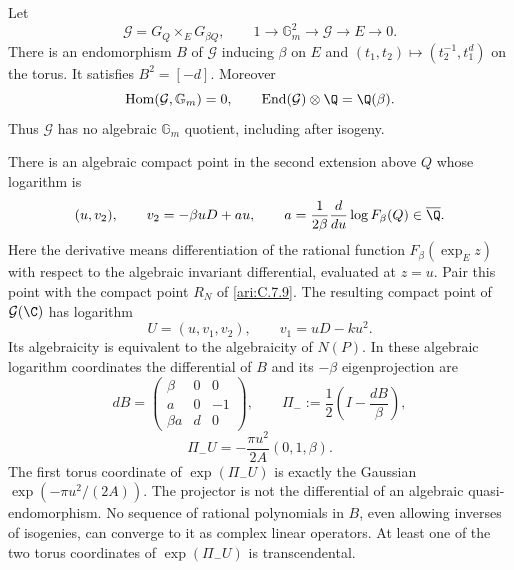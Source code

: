 \begin{proposition}\hypertarget{tag-0018}{}\label{ari:C.7.10}

Let
\[
 \mathcal G=G_Q\mathbin{\times_E}G_{\beta Q},\qquad
 1\longrightarrow\mathbb G_m^2\longrightarrow\mathcal G
       \longrightarrow E\longrightarrow0.
\]
There is an endomorphism $B$ of $\mathcal G$ inducing
$\beta$ on $E$ and
$(t_1,t_2)\mapsto(t_2^{-1},t_1^d)$ on the torus.
It satisfies $B^2=[-d]$. Moreover
\[
 \operatorname{Hom}(\mathcal G,\mathbb G_m)=0,
 \qquad
 \operatorname{End}(\mathcal G)\otimes\Q=\Q(\beta).
\]
Thus $\mathcal G$ has no algebraic $\mathbb G_m$ quotient,
including after isogeny.

There is an algebraic compact point in the second extension
above $Q$ whose logarithm is
\[
 (u,v_2),\qquad v_2=-\beta uD+au,
 \qquad
 a=\frac1{2\beta}
       \frac{d}{du}\log F_\beta(Q)\in\overline\Q.
\]
Here the derivative means differentiation of the rational
function $F_\beta(\exp_E z)$ with respect to the algebraic
invariant differential, evaluated at $z=u$.
Pair this point with the compact point $R_N$ of
\ref{ari:C.7.9}. The resulting compact point of $\mathcal G(\C)$
has logarithm
\[
 U=(u,v_1,v_2),\qquad v_1=uD-ku^2.
\]
Its algebraicity is equivalent to the algebraicity of $N(P)$.
In these algebraic logarithm coordinates the differential of
$B$ and its $-\beta$ eigenprojection are
\[
 dB=\begin{pmatrix}
 \beta&0&0\\ a&0&-1\\ \beta a&d&0
 \end{pmatrix},\qquad
 \Pi_-:=\frac12\left(I-\frac{dB}{\beta}\right),
\]
\[
 \Pi_-U=-\frac{\pi u^2}{2A}(0,1,\beta).
\]
The first torus coordinate of $\exp(\Pi_-U)$ is exactly
the Gaussian $\exp(-\pi u^2/(2A))$. The projector is not
the differential of an algebraic quasi-endomorphism. No
sequence of rational polynomials in $B$, even allowing
inverses of isogenies, can converge to it as complex linear
operators. At least one of the two torus coordinates of
$\exp(\Pi_-U)$ is transcendental.
\end{proposition}


